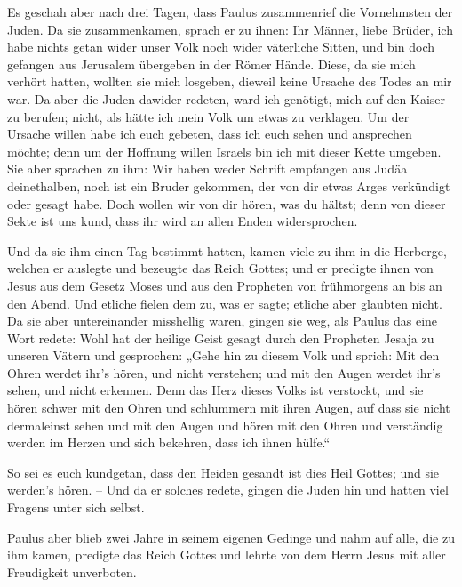  Es geschah aber nach drei Tagen, dass Paulus
zusammenrief die Vornehmsten der Juden. Da sie zusammenkamen, sprach er
zu ihnen: Ihr Männer, liebe Brüder, ich habe nichts getan wider unser
Volk noch wider väterliche Sitten, und bin doch gefangen aus Jerusalem
übergeben in der Römer Hände.  Diese, da sie mich verhört
hatten, wollten sie mich losgeben, dieweil keine Ursache des Todes an
mir war.  Da aber die Juden dawider redeten, ward ich
genötigt, mich auf den Kaiser zu berufen; nicht, als hätte ich mein Volk
um etwas zu verklagen.  Um der Ursache willen habe ich
euch gebeten, dass ich euch sehen und ansprechen möchte; denn um der
Hoffnung willen Israels bin ich mit dieser Kette umgeben.
 Sie aber sprachen zu ihm: Wir haben weder Schrift
empfangen aus Judäa deinethalben, noch ist ein Bruder gekommen, der von
dir etwas Arges verkündigt oder gesagt habe.  Doch wollen
wir von dir hören, was du hältst; denn von dieser Sekte ist uns kund,
dass ihr wird an allen Enden widersprochen.

 Und da sie ihm einen Tag bestimmt hatten, kamen viele zu
ihm in die Herberge, welchen er auslegte und bezeugte das Reich Gottes;
und er predigte ihnen von Jesus aus dem Gesetz Moses und aus den
Propheten von frühmorgens an bis an den Abend.  Und
etliche fielen dem zu, was er sagte; etliche aber glaubten nicht.
 Da sie aber untereinander misshellig waren, gingen sie
weg, als Paulus das eine Wort redete: Wohl hat der heilige Geist gesagt
durch den Propheten Jesaja zu unseren Vätern  und
gesprochen: „Gehe hin zu diesem Volk und sprich: Mit den Ohren werdet
ihr's hören, und nicht verstehen; und mit den Augen werdet ihr's sehen,
und nicht erkennen.  Denn das Herz dieses Volks ist
verstockt, und sie hören schwer mit den Ohren und schlummern mit ihren
Augen, auf dass sie nicht dermaleinst sehen und mit den Augen und hören
mit den Ohren und verständig werden im Herzen und sich bekehren, dass
ich ihnen hülfe.``

 So sei es euch kundgetan, dass den Heiden gesandt ist
dies Heil Gottes; und sie werden's hören. --  Und da er
solches redete, gingen die Juden hin und hatten viel Fragens unter sich
selbst.

 Paulus aber blieb zwei Jahre in seinem eigenen Gedinge
und nahm auf alle, die zu ihm kamen,  predigte das Reich
Gottes und lehrte von dem Herrn Jesus mit aller Freudigkeit unverboten.
